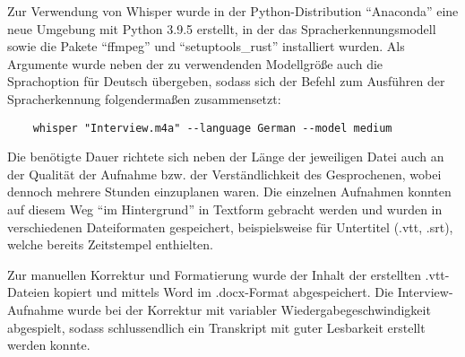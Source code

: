 Zur Verwendung von Whisper wurde in der Python-Distribution \enquote{Anaconda} eine neue Umgebung mit Python 3.9.5 erstellt, in der das Spracherkennungsmodell sowie die Pakete \enquote{ffmpeg} und \enquote{setuptools\_rust} installiert wurden. Als Argumente wurde neben der zu verwendenden Modellgröße auch die Sprachoption für Deutsch übergeben, sodass sich der Befehl zum Ausführen der Spracherkennung folgendermaßen zusammensetzt:

\begin{verbatim}
	whisper "Interview.m4a" --language German --model medium
\end{verbatim}

Die benötigte Dauer richtete sich neben der Länge der jeweiligen Datei auch an der Qualität der Aufnahme bzw. der Verständlichkeit des Gesprochenen, wobei dennoch mehrere Stunden einzuplanen waren. Die einzelnen Aufnahmen konnten auf diesem Weg \enquote{im Hintergrund} in Textform gebracht werden und wurden in verschiedenen Dateiformaten gespeichert, beispielsweise für Untertitel (.vtt, .srt), welche bereits Zeitstempel enthielten.

Zur manuellen Korrektur und Formatierung wurde der Inhalt der erstellten .vtt-Dateien kopiert und mittels Word im .docx-Format abgespeichert. Die Interview-Aufnahme wurde bei der Korrektur mit variabler Wiedergabegeschwindigkeit abgespielt, sodass schlussendlich ein Transkript mit guter Lesbarkeit erstellt werden konnte.